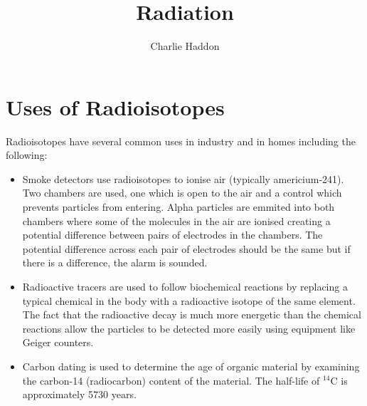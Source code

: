 \documentclass[a4,8pt]{article}
\title{Radiation}
\author{Charlie Haddon}
\begin{document}
\section{Uses of Radioisotopes}
Radioisotopes have several common uses in industry and in homes including the
following:

\begin{itemize}
    \item Smoke detectors use radioisotopes to ionise air (typically 
    americium-241). Two chambers are used, one which is open to the air and a 
    control which prevents particles from entering. Alpha particles are emmited 
    into both chambers where some of the molecules in the air are ionised 
    creating a potential difference between pairs of electrodes in the chambers. 
    The potential difference across each pair of electrodes should be the same 
    but if there is a difference, the alarm is sounded.
    \item Radioactive tracers are used to follow biochemical reactions by 
    replacing a typical chemical in the body with a radioactive isotope of the 
    same element. The fact that the radioactive decay is much more energetic
    than the chemical reactions allow the particles to be detected more easily
    using equipment like Geiger counters.
    \item Carbon dating is used to determine the age of organic material by 
    examining the carbon-14 (radiocarbon) content of the material. The half-life
    of $^{14}$C is approximately 5730 years.
\end{itemize}
\end{document}
